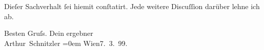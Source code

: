 \pstart
           Dieſer Sachverhalt ſei hiemit conſtatirt. Jede weitere Discuſſion darüber lehne ich
               ab.\pend
           
\pstart
           Besten Gruſs. Dein ergebner{\\[\baselineskip]}\spacefill\mbox{Arthur Schnitzler}\pend
           \leftskip=0em{}
\pstart
           Wien7. 3. 99.\pend
           \endnumbering{}  
      